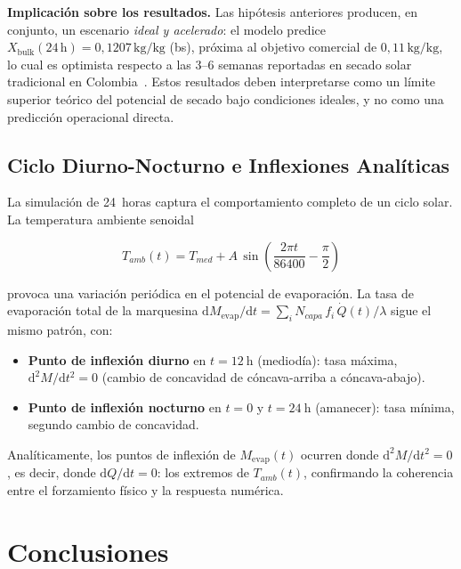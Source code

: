 \documentclass[conference]{IEEEtran}
\begin{document}
\noindent\textbf{Implicación sobre los resultados.} Las hipótesis anteriores producen, en conjunto, un escenario \emph{ideal y acelerado}: el modelo predice $X_{\text{bulk}}(24\,\text{h}) = 0{,}1207\,\text{kg/kg}$ (bs), próxima al objetivo comercial de $0{,}11\,\text{kg/kg}$, lo cual es optimista respecto a las 3–6 semanas reportadas en secado solar tradicional en Colombia~\cite{parra08}. Estos resultados deben interpretarse como un límite superior teórico del potencial de secado bajo condiciones ideales, y no como una predicción operacional directa.

\subsection{Ciclo Diurno-Nocturno e Inflexiones Analíticas}

La simulación de 24~horas captura el comportamiento completo de un ciclo solar. La temperatura ambiente senoidal

\begin{equation}
T_{amb}(t) = T_{med} + A\,\sin\!\left(\frac{2\pi t}{86400} - \frac{\pi}{2}\right)
\label{eq:Tamb_24h}
\end{equation}

provoca una variación periódica en el potencial de evaporación. La tasa de evaporación total de la marquesina $\mathrm{d}M_{\text{evap}}/\mathrm{d}t = \sum_i N_{capa}\,f_i\,\dot{Q}(t)/\lambda$ sigue el mismo patrón, con:

\begin{itemize}
  \item \textbf{Punto de inflexión diurno} en $t=\qty{12}{\hour}$ (mediodía): tasa máxima, $\mathrm{d}^2M/\mathrm{d}t^2 = 0$ (cambio de concavidad de cóncava-arriba a cóncava-abajo).
  \item \textbf{Punto de inflexión nocturno} en $t=0$ y $t=\qty{24}{\hour}$ (amanecer): tasa mínima, segundo cambio de concavidad.
\end{itemize}

Analíticamente, los puntos de inflexión de $M_{\text{evap}}(t)$ ocurren donde $\mathrm{d}^2M/\mathrm{d}t^2 = 0$, es decir, donde $\mathrm{d}Q/\mathrm{d}t = 0$: los extremos de $T_{amb}(t)$, confirmando la coherencia entre el forzamiento físico y la respuesta numérica.


\section{Conclusiones}
\end{document}
